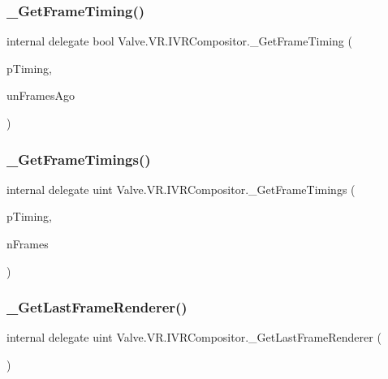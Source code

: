 \subsubsection{\texorpdfstring{\_GetFrameTiming()}{\_GetFrameTiming()}}
{\footnotesize\ttfamily internal delegate bool Valve.\+V\+R.\+I\+V\+R\+Compositor.\+\_\+\+Get\+Frame\+Timing (\begin{DoxyParamCaption}\item[{ref \mbox{\hyperlink{struct_valve_1_1_v_r_1_1_compositor___frame_timing}{Compositor\+\_\+\+Frame\+Timing}}}]{p\+Timing,  }\item[{uint}]{un\+Frames\+Ago }\end{DoxyParamCaption})}

\mbox{\label{struct_valve_1_1_v_r_1_1_i_v_r_compositor_a136355380a2308c5dc9f690b1ca77c60}} 
\subsubsection{\texorpdfstring{\_GetFrameTimings()}{\_GetFrameTimings()}}
{\footnotesize\ttfamily internal delegate uint Valve.\+V\+R.\+I\+V\+R\+Compositor.\+\_\+\+Get\+Frame\+Timings (\begin{DoxyParamCaption}\item[{\mbox{[}\+In, Out\mbox{]} \mbox{\hyperlink{struct_valve_1_1_v_r_1_1_compositor___frame_timing}{Compositor\+\_\+\+Frame\+Timing}} \mbox{[}$\,$\mbox{]}}]{p\+Timing,  }\item[{uint}]{n\+Frames }\end{DoxyParamCaption})}

\mbox{\label{struct_valve_1_1_v_r_1_1_i_v_r_compositor_a907be4acb4579b5ee85ba1c6b455f1ea}} 
\subsubsection{\texorpdfstring{\_GetLastFrameRenderer()}{\_GetLastFrameRenderer()}}
{\footnotesize\ttfamily internal delegate uint Valve.\+V\+R.\+I\+V\+R\+Compositor.\+\_\+\+Get\+Last\+Frame\+Renderer (\begin{DoxyParamCaption}{ }\end{DoxyParamCaption})}

